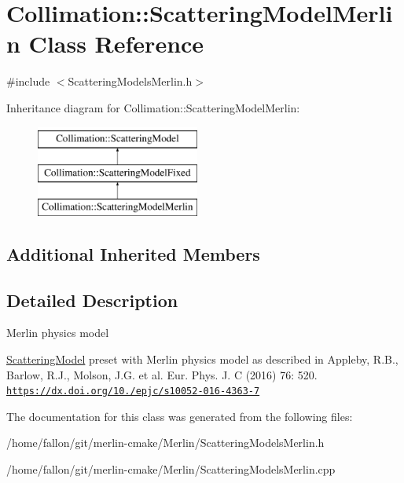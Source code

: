 \hypertarget{classCollimation_1_1ScatteringModelMerlin}{}\section{Collimation\+:\+:Scattering\+Model\+Merlin Class Reference}
\label{classCollimation_1_1ScatteringModelMerlin}


{\ttfamily \#include $<$Scattering\+Models\+Merlin.\+h$>$}

Inheritance diagram for Collimation\+:\+:Scattering\+Model\+Merlin\+:\begin{figure}[H]
\begin{center}
\leavevmode
\includegraphics[height=3.000000cm]{classCollimation_1_1ScatteringModelMerlin}
\end{center}
\end{figure}
\subsection*{Additional Inherited Members}


\subsection{Detailed Description}
Merlin physics model

\hyperlink{classCollimation_1_1ScatteringModel}{Scattering\+Model} preset with Merlin physics model as described in Appleby, R.\+B., Barlow, R.\+J., Molson, J.\+G. et al. Eur. Phys. J. C (2016) 76\+: 520. \href{https://dx.doi.org/10.1140/epjc/s10052-016-4363-7}{\tt https\+://dx.\+doi.\+org/10./epjc/s10052-\/016-\/4363-\/7} 

The documentation for this class was generated from the following files\+:\begin{DoxyCompactItemize}
\item 
/home/fallon/git/merlin-\/cmake/\+Merlin/Scattering\+Models\+Merlin.\+h\item 
/home/fallon/git/merlin-\/cmake/\+Merlin/Scattering\+Models\+Merlin.\+cpp\end{DoxyCompactItemize}
